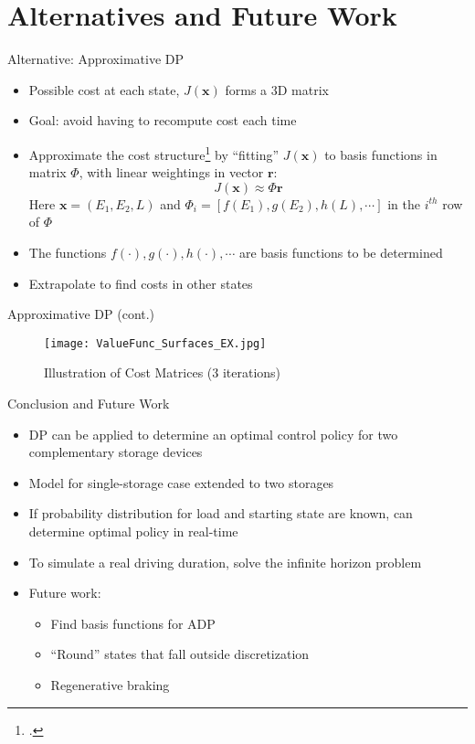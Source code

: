 \documentclass{beamer}
\begin{document}
\section{Alternatives and Future Work}
\begin{frame}{Alternative: Approximative DP}
\begin{itemize}
\item Possible cost at each state, $J(\textbf{x})$ forms a 3D matrix
\item Goal: avoid having to recompute cost each time
\item Approximate the cost structure\footcite{bertsekas1995dynamic} by “fitting” $J(\textbf{x})$ to basis functions in matrix $\Phi$,  with linear weightings in vector $\textbf{r}$:
\begin{equation}
J(\textbf{x})\approx\Phi\textbf{r}
\end{equation}
Here $\textbf{x}=(E_{1},E_{2},L)$ and
\begin{math}
\Phi_{i}=[f(E_{1}),g(E_{2}),h(L),\cdots]
\end{math}
in the $i^{th}$ row of $\Phi$
\item The functions $f(\cdot), g(\cdot), h(\cdot), \cdots$ are basis functions to be determined
\item Extrapolate to find costs in other states

\end{itemize}
\end{frame}

\begin{frame}{Approximative DP (cont.)}
\begin{figure}
\texttt{[image: ValueFunc\_Surfaces\_EX.jpg]}
\caption{Illustration of Cost Matrices (3 iterations)}
\end{figure}
\end{frame}


\begin{frame}{Conclusion and Future Work}
\begin{itemize}
\item DP can be applied to determine an optimal control policy for two complementary storage devices
\item Model for single-storage case extended to two storages
\item If probability distribution for load and starting state are known, can determine optimal policy in real-time
\item To simulate a real driving duration, solve the infinite horizon problem
\item Future work:
\begin{itemize}
\item Find basis functions for ADP
\item “Round” states that fall outside discretization
\item Regenerative braking
\end{itemize}

\end{itemize}
\end{frame}
\end{document}
